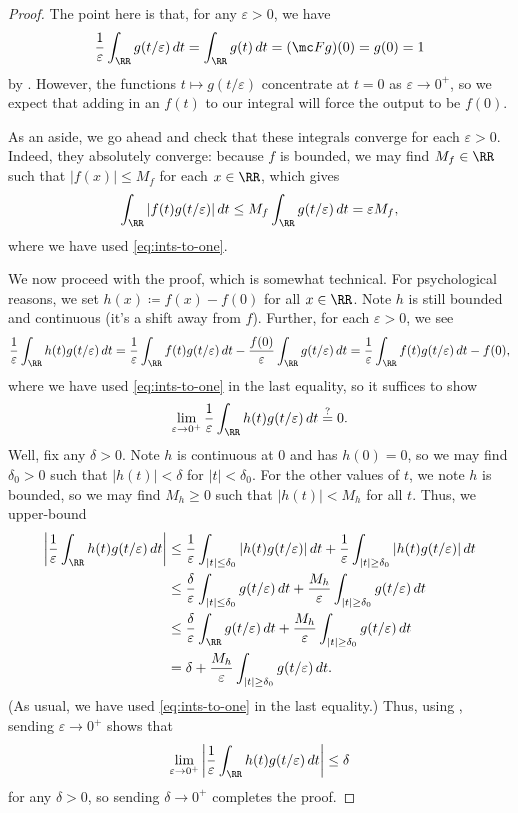 \documentclass[notes.tex]{subfiles}
\begin{document}
\begin{proof}
	The point here is that, for any $\varepsilon>0$, we have
	\begin{equation}
		\frac1\varepsilon\int_\RR g(t/\varepsilon)\,dt=\int_\RR g(t)\,dt=(\mc Fg)(0)=g(0)=1 \label{eq:ints-to-one}
	\end{equation}
	by . However, the functions $t\mapsto g(t/\varepsilon)$ concentrate at $t=0$ as $\varepsilon\to0^+$, so we expect that adding in an $f(t)$ to our integral will force the output to be $f(0)$.

	As an aside, we go ahead and check that these integrals converge for each $\varepsilon>0$. Indeed, they absolutely converge: because $f$ is bounded, we may find $M_f\in\RR$ such that $|f(x)|\le M_f$ for each $x\in\RR$, which gives
	\[\int_\RR|f(t)g(t/\varepsilon)|\,dt\le M_f\int_\RR g(t/\varepsilon)\,dt=\varepsilon M_f,\]
	where we have used \eqref{eq:ints-to-one}.

	We now proceed with the proof, which is somewhat technical. For psychological reasons, we set $h(x)\coloneqq f(x)-f(0)$ for all $x\in\RR$. Note $h$ is still bounded and continuous (it's a shift away from $f$). Further, for each $\varepsilon>0$, we see
	\[\frac1\varepsilon\int_\RR h(t)g(t/\varepsilon)\,dt=\frac1\varepsilon\int_\RR f(t)g(t/\varepsilon)\,dt-\frac{f(0)}\varepsilon\int_\RR g(t/\varepsilon)\,dt=\frac1\varepsilon\int_\RR f(t)g(t/\varepsilon)\,dt-f(0),\]
	where we have used \eqref{eq:ints-to-one} in the last equality, so it suffices to show
	\[\lim_{\varepsilon\to0^+}\frac1\varepsilon\int_\RR h(t)g(t/\varepsilon)\,dt\stackrel?=0.\]
	Well, fix any $\delta>0$. Note $h$ is continuous at $0$ and has $h(0)=0$, so we may find $\delta_0>0$ such that $|h(t)|<\delta$ for $|t|<\delta_0$. For the other values of $t$, we note $h$ is bounded, so we may find $M_h\ge0$ such that $|h(t)|<M_h$ for all $t$. Thus, we upper-bound
	\begin{align*}
		\left|\frac1\varepsilon\int_\RR h(t)g(t/\varepsilon)\,dt\right| &\le \frac1\varepsilon\int_{|t|\le\delta_0}|h(t)g(t/\varepsilon)|\,dt+\frac1\varepsilon\int_{|t|\ge\delta_0}|h(t)g(t/\varepsilon)|\,dt \\
		&\le \frac\delta\varepsilon\int_{|t|\le\delta_0}g(t/\varepsilon)\,dt+\frac{M_h}\varepsilon\int_{|t|\ge\delta_0}g(t/\varepsilon)\,dt \\
		&\le \frac\delta\varepsilon\int_\RR g(t/\varepsilon)\,dt+\frac{M_h}\varepsilon\int_{|t|\ge\delta_0}g(t/\varepsilon)\,dt \\
		&= \delta+\frac{M_h}\varepsilon\int_{|t|\ge\delta_0}g(t/\varepsilon)\,dt.
	\end{align*}
	(As usual, we have used \eqref{eq:ints-to-one} in the last equality.) Thus, using , sending $\varepsilon\to0^+$ shows that
	\[\lim_{\varepsilon\to0^+}\left|\frac1\varepsilon\int_\RR h(t)g(t/\varepsilon)\,dt\right|\le\delta\]
	for any $\delta>0$, so sending $\delta\to0^+$ completes the proof.
\end{proof}
\end{document}
